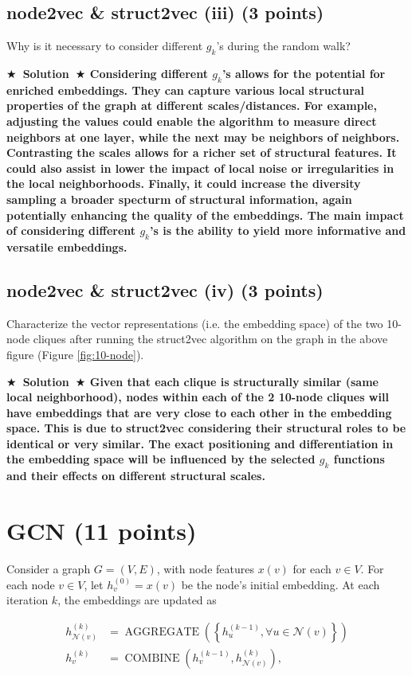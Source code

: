 \documentclass{article}
\numberwithin{figure}{section}
\newcommand{\Solution}[1]{{\medskip \color{red} \bf $\bigstar$~\sf \textbf{Solution}~$\bigstar$ \sf #1 } \bigskip}
\begin{document}
\subsection{node2vec \& struct2vec (iii) (3 points)}
Why is it necessary to consider different $g_k$'s during the random walk?

\Solution{
Considering different $g_k$'s allows for the potential for enriched embeddings. They can capture various local structural properties of the graph at different scales/distances. For example, adjusting the values could enable the algorithm to measure direct neighbors at one layer, while the next may be neighbors of neighbors. Contrasting the scales allows for a richer set of structural features. It could also assist in lower the impact of local noise or irregularities in the local neighborhoods. Finally, it could increase the diversity sampling a broader specturm of structural information, again potentially enhancing the quality of the embeddings. The main impact of considering different $g_k$'s is the ability to yield more informative and versatile embeddings.
}

\subsection{node2vec \& struct2vec (iv) (3 points)}
Characterize the vector representations (i.e. the embedding space) of the two 10-node cliques after running the struct2vec algorithm on the graph in the above figure (Figure \ref{fig:10-node}).

\Solution{
Given that each clique is structurally similar (same local neighborhood), nodes within each of the 2 10-node cliques will have embeddings that are very close to each other in the embedding space. This is due to struct2vec considering their structural roles to be identical or very similar. The exact positioning and differentiation in the embedding space will be influenced by the selected $g_k$ functions and their effects on different structural scales.
}


\section{GCN (11 points)}

Consider a graph $G = (V, E)$, with node features $x(v)$ for each $v \in V$. For each node $v \in V$, let $h^{(0)}_v = x(v)$ be the node’s initial embedding. At each iteration $k$, the embeddings are updated as 

$$
\begin{aligned}
h_{\mathcal{N}(v)}^{(k)} & =\operatorname{AGGREGATE}\left(\left\{h_u^{(k-1)}, \forall u \in \mathcal{N}(v)\right\}\right) \\
h_v^{(k)} & =\operatorname{COMBINE}\left(h_v^{(k-1)}, h_{\mathcal{N}(v)}^{(k)}\right),
\end{aligned}
$$
\end{document}
